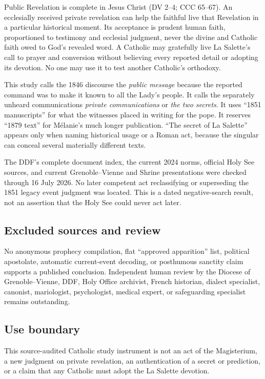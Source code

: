 {Public Revelation is complete in Jesus Christ (DV 2--4; CCC 65--67). An ecclesially received private revelation can help the faithful live that Revelation in a particular historical moment. Its acceptance is prudent human faith, proportioned to testimony and ecclesial judgment, never the divine and Catholic faith owed to God's revealed word. A Catholic may gratefully live La Salette's call to prayer and conversion without believing every reported detail or adopting its devotion. No one may use it to test another Catholic's orthodoxy.

This study calls the 1846 discourse the \emph{public message} because the reported command was to make it known to all the Lady's people. It calls the separately unheard communications \emph{private communications} or \emph{the two secrets}. It uses ``1851 manuscripts'' for what the witnesses placed in writing for the pope. It reserves ``1879 text'' for Mélanie's much longer publication. ``The secret of La Salette'' appears only when naming historical usage or a Roman act, because the singular can conceal several materially different texts.

The DDF's complete document index, the current 2024 norms, official Holy See sources, and current Grenoble--Vienne and Shrine presentations were checked through 16 July 2026. No later competent act reclassifying or superseding the 1851 legacy event judgment was located. This is a dated negative-search result, not an assertion that the Holy See could never act later.


\subsection{Excluded sources and review}

No anonymous prophecy compilation, flat ``approved apparition'' list, political apostolate, automatic current-event decoding, or posthumous sanctity claim supports a published conclusion. Independent human review by the Diocese of Grenoble--Vienne, DDF, Holy Office archivist, French historian, dialect specialist, canonist, mariologist, psychologist, medical expert, or safeguarding specialist remains outstanding.

\subsection{Use boundary}

This source-audited Catholic study instrument is not an act of the Magisterium, a new judgment on private revelation, an authentication of a secret or prediction, or a claim that any Catholic must adopt the La Salette devotion.
}
